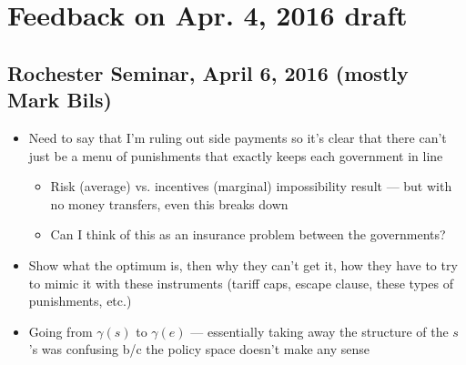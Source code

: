 \documentclass[12pt]{article}
\newcommand{\ga}{\gamma}
\begin{document}
\section{Feedback on Apr. 4, 2016 draft}

\subsection{Rochester Seminar, April 6, 2016 (mostly Mark Bils)}
\begin{itemize}
	\item Need to say that I'm ruling out side payments so it's clear that there can't just be a menu of punishments that exactly keeps each government in line
		\begin{itemize}
			\item Risk (average) vs. incentives (marginal) impossibility result --- but with no money transfers, even this breaks down
			\item Can I think of this as an insurance problem between the governments?
		\end{itemize}
	\item Show what the optimum is, then why they can't get it, how they have to try to mimic it with these instruments (tariff caps, escape clause, these types of punishments, etc.)
	\item Going from $\ga(s)$ to $\ga(e)$ --- essentially taking away the structure of the $s$'s was confusing b/c the policy space doesn't make any sense
\end{itemize}
\end{document}
